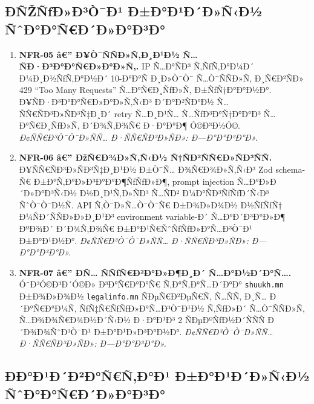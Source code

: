\documentclass[12pt,A4]{report}
\begin{document}
\subsection{ÐÑŽÑƒÐ»Ð³Ò¯Ð¹ Ð±Ð°Ð¹Ð´Ð»Ñ‹Ð½ ÑˆÐ°Ð°Ñ€Ð´Ð»Ð°Ð³Ð°}

\begin{enumerate}

  \item \textbf{NFR-05 â€” Ð¥Ò¯ÑÑÐ»Ñ‚Ð¸Ð¹Ð½ Ñ…ÑÐ·Ð³Ð°Ð°Ñ€Ð»Ð°Ð»Ñ‚.}
        IP Ñ…Ð°ÑÐ³ Ñ‚ÑƒÑ‚Ð°Ð¼Ð´ Ð¼Ð¸Ð½ÑƒÑ‚Ð°Ð½Ð´ 10-Ð°Ð°Ñ Ð¸Ð»Ò¯Ò¯ Ñ…Ò¯ÑÑÐ»Ñ‚
        Ð¸Ñ€Ð²ÑÐ» 429 ``Too Many Requests'' Ñ…Ð°Ñ€Ð¸ÑƒÐ»Ñ‚ Ð±ÑƒÑ†Ð°Ð°Ð½Ð°.
        Ð¥ÑÐ·Ð³Ð°Ð°Ñ€Ð»Ð°Ð»Ñ‚Ñ‹Ð³ Ð´Ð°Ð²ÑÐ°Ð½ Ñ…ÑÑ€ÑÐ³Ð»ÑÐ³Ñ‡Ð¸Ð´ retry Ñ…Ð¸Ð¹Ñ…
        Ñ…ÑƒÐ³Ð°Ñ†Ð°Ð°Ð³ Ñ…Ð°Ñ€Ð¸ÑƒÐ»Ñ‚ Ð´Ð¾Ñ‚Ð¾Ñ€ Ð·Ð°Ð°Ð¶ Ó©Ð³Ð½Ó©.
        \textit{Ð¢ÑÑ€Ð³Ò¯Ò¯Ð»ÑÑ… Ð·ÑÑ€ÑÐ³Ð»ÑÐ»: Ð—Ð°Ð°Ð²Ð°Ð».}

  \item \textbf{NFR-06 â€” ÐžÑ€Ð¾Ð»Ñ‚Ñ‹Ð½ Ñ†ÑÐ²ÑÑ€Ð»ÑÐ³ÑÑ.}
        Ð¥ÑÑ€ÑÐ³Ð»ÑÐ³Ñ‡Ð¸Ð¹Ð½ Ð±Ò¯Ñ… Ð¾Ñ€Ð¾Ð»Ñ‚Ñ‹Ð³ Zod schema-Ñ€
        Ð±Ð°Ñ‚Ð°Ð»Ð³Ð°Ð°Ð¶ÑƒÑƒÐ»Ð¶, prompt injection Ñ…Ð°Ð»Ð´Ð»Ð°Ð³Ñ‹Ð½
        Ð½Ð¸Ð¹Ñ‚Ð»ÑÐ³ Ñ…ÑÐ² Ð¼Ð°ÑÐ³ÑƒÑƒÐ´Ñ‹Ð³ ÑˆÒ¯Ò¯Ð½Ñ. API Ñ‚Ò¯Ð»Ñ…Ò¯Ò¯Ñ€
        Ð±Ð¾Ð»Ð¾Ð½ Ð½ÑƒÑƒÑ† Ð¼ÑÐ´ÑÑÐ»Ð»Ð¸Ð¹Ð³ environment variable-Ð´
        Ñ…Ð°Ð´Ð³Ð°Ð»Ð¶ ÐºÐ¾Ð´ Ð´Ð¾Ñ‚Ð¾Ñ€ Ð±Ð°Ð¹Ñ€ÑˆÑƒÑƒÐ»Ð°Ñ…Ð³Ò¯Ð¹ Ð±Ð°Ð¹Ð½Ð°.
        \textit{Ð¢ÑÑ€Ð³Ò¯Ò¯Ð»ÑÑ… Ð·ÑÑ€ÑÐ³Ð»ÑÐ»: Ð—Ð°Ð°Ð²Ð°Ð».}

  \item \textbf{NFR-07 â€” Ð­Ñ… ÑÑƒÑ€Ð²Ð°Ð»Ð¶Ð¸Ð´ Ñ…Ð°Ð½Ð´Ð°Ñ….}
        Ó¨Ð³Ó©Ð³Ð´Ó©Ð» Ð³Ð°Ñ€Ð°Ð°Ñ€ Ñ‚Ð°Ñ‚Ð°Ñ…Ð´Ð°Ð° \texttt{shuukh.mn}
        Ð±Ð¾Ð»Ð¾Ð½ \texttt{legalinfo.mn} ÑÐµÑ€Ð²ÐµÑ€Ñ‚ Ñ…ÑÑ‚ Ð¸Ñ…
        Ð´Ð°Ñ€Ð°Ð¼Ñ‚ ÑƒÑ‡Ñ€ÑƒÑƒÐ»Ð°Ñ…Ð³Ò¯Ð¹Ð½ Ñ‚ÑƒÐ»Ð´ Ñ…Ò¯ÑÑÐ»Ñ‚ Ñ…Ð¾Ð¾Ñ€Ð¾Ð½Ð´Ñ‹Ð½
        Ð·Ð°Ð¹Ð³ 2 ÑÐµÐºÑƒÐ½Ð´ÑÑÑ Ð´Ð¾Ð¾ÑˆÐ³Ò¯Ð¹ Ð±Ð°Ð¹Ð»Ð³Ð°Ð½Ð°.
        \textit{Ð¢ÑÑ€Ð³Ò¯Ò¯Ð»ÑÑ… Ð·ÑÑ€ÑÐ³Ð»ÑÐ»: Ð—Ð°Ð°Ð²Ð°Ð».}

\end{enumerate}

\subsection{ÐÐ°Ð¹Ð´Ð²Ð°Ñ€Ñ‚Ð°Ð¹ Ð±Ð°Ð¹Ð´Ð»Ñ‹Ð½ ÑˆÐ°Ð°Ñ€Ð´Ð»Ð°Ð³Ð°}
\end{document}
